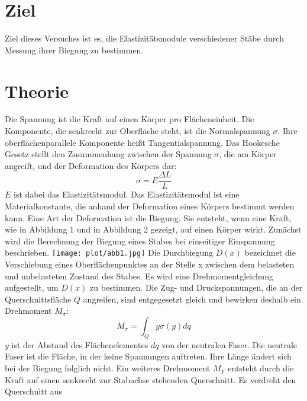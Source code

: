 

\maketitle
\tableofcontents
\newpage
\section{Ziel}
Ziel dieses Versuches ist es, die Elastizitätsmodule
verschiedener Stäbe durch Messung ihrer Biegung
zu bestimmen.
\section{Theorie}
Die Spannung ist die Kraft auf einen Körper pro Flächeneinheit.
Die Komponente, die senkrecht zur Oberfläche steht,
ist die Normalspannung $\sigma$. Ihre oberflächenparallele
Komponente heißt Tangentialspannung.
Das Hookesche Gesetz stellt den Zusammenhang zwischen
der Spannung $\sigma$, die am Körper angreift, und der
Deformation des Körpers dar:
\begin{equation}
\sigma = E \frac{\Delta L}{L}
\label{eqn:Hooke}
\end{equation}
$E$ ist dabei das Elastizitätsmodul.
Das Elastizitätsmodul ist eine Materialkonstante, die
anhand der Deformation eines Körpers bestimmt werden kann.
Eine Art der Deformation ist die Biegung. Sie entsteht, wenn
eine Kraft, wie in Abbildung 1 und in Abbildung 2 gezeigt, auf einen Körper wirkt. %
Zunächst wird die Berechnung der Biegung eines Stabes bei einseitiger
Einspannung beschrieben. %
\texttt{[image: plot/abb1.jpg]}
Die Durchbiegung $D(x)$ bezeichnet die Verschiebung eines Oberflächenpunktes
an der Stelle x zwischen dem belasteten und unbelasteten Zustand des Stabes.
Es wird eine Drehmomentgleichung aufgestellt, um $D(x)$ zu bestimmen.
Die Zug- und Druckspannungen, die an der Querschnittsfläche $Q$ angreifen,
sind entgegesetzt gleich und bewirken deshalb ein Drehmoment $M_{\sigma}$:
\begin{equation*}
M_{\sigma} = \int_{Q} y \sigma(y) dq
\end{equation*}
$y$ ist der Abstand des Flächenelementes $dq$ von der neutralen
Faser. Die neutrale Faser ist die Fläche, in der keine Spannungen
auftreten. Ihre Länge ändert sich bei der Biegung folglich nicht.
Ein weiteres Drehmoment $M_{F}$ entsteht durch die Kraft auf einen senkrecht
zur Stabachse stehenden Querschnitt. Es verdreht den Querschnitt aus 
